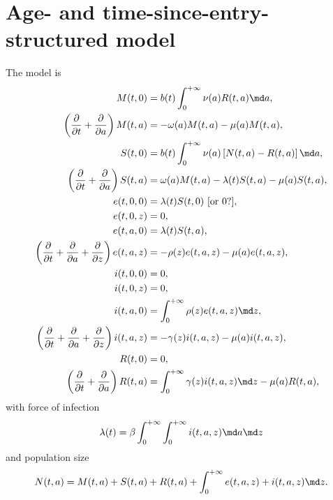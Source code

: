 \documentclass{jpmarticle}
\begin{document}
\section{Age- and time-since-entry-structured model}

The model is
\begin{equation}
  \label{model_age_and_time_since_entry_structured}
  \begin{split}
    M(t, 0) &=
    b(t) \int_0^{+\infty} \nu(a) R(t, a) \md a,
    \\
    \left(\frac{\partial}{\partial t}
      + \frac{\partial}{\partial a}\right)
    M(t, a) &=
    - \omega(a) M(t, a) - \mu(a) M(t, a),
    \\
    S(t, 0) &=
    b(t) \int_0^{+\infty} \nu(a) \left[N(t, a) - R(t, a)\right] \md a,
    \\
    \left(\frac{\partial}{\partial t}
      + \frac{\partial}{\partial a}\right)
    S(t, a) &=
    \omega(a) M(t, a) - \lambda(t) S(t, a) - \mu(a) S(t, a),
    \\
    e(t, 0, 0) &=
    \lambda(t) S(t, 0)
    \text{ [or $0$?]},
    \\
    e(t, 0, z) &=
    0,
    \\
    e(t, a, 0) &=
    \lambda(t) S(t, a),
    \\
    \left(\frac{\partial}{\partial t}
      + \frac{\partial}{\partial a}
      + \frac{\partial}{\partial z}\right)
    e(t, a, z) &=
    - \rho(z) e(t, a, z) - \mu(a) e(t, a, z),
    \\
    i(t, 0, 0) &=
    0,
    \\
    i(t, 0, z) &=
    0,
    \\
    i(t, a, 0) &=
    \int_0^{+\infty} \rho(z) e(t, a, z) \md z,
    \\
    \left(\frac{\partial}{\partial t}
      + \frac{\partial}{\partial a}
      + \frac{\partial}{\partial z}\right)
    i(t, a, z) &=
    - \gamma(z) i(t, a, z) - \mu(a) i(t, a, z),
    \\
    R(t, 0) &=
    0,
    \\
    \left(\frac{\partial}{\partial t}
      + \frac{\partial}{\partial a}\right)
    R(t, a) &=
    \int_0^{+\infty} \gamma(z) i(t, a, z) \md z
    - \mu(a) R(t, a),
  \end{split}
\end{equation}
with force of infection
\begin{equation}
  \lambda(t) =
  \beta
  \int_0^{+\infty} \int_0^{+\infty}
  i(t, a, z)
  \md a \md z
\end{equation}
and population size
\begin{equation}
  N(t, a) =
  M(t, a) + S(t, a) + R(t, a)
  + \int_0^{+\infty} e(t, a, z) + i(t, a, z) \md z.
\end{equation}
\end{document}
